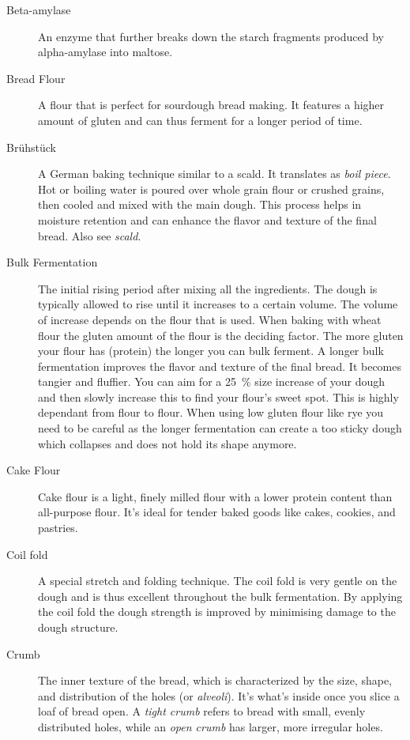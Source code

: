 \begin{description}
\item[Beta-amylase] An enzyme that further breaks down the starch fragments
produced by alpha-amylase into maltose.

\item[Bread Flour] A flour that is perfect for sourdough bread making. It features
a higher amount of gluten and can thus ferment for a longer period of time.

\item[Brühstück] A German baking technique similar to a scald. It translates as
\emph{boil piece}. Hot or boiling water is poured over whole grain flour or crushed grains,
then cooled and mixed with the main dough. This process helps in moisture retention
and can enhance the flavor and texture of the final bread. Also see \emph{scald}.

\item[Bulk Fermentation] The initial rising period after mixing all the ingredients.
The dough is typically allowed to rise until it increases to a certain volume. The
volume of increase depends on the flour that is used. When baking with wheat flour
the gluten amount of the flour is the deciding factor. The more gluten your flour has
(protein) the longer you can bulk ferment. A longer bulk fermentation improves the
flavor and texture of the final bread. It becomes tangier and fluffier. You can aim
for a \SI{25}{\percent} size increase of your dough and then slowly increase this to find your
flour’s sweet spot. This is highly dependant from flour to flour. When using low gluten
flour like rye you need to be careful as the longer fermentation can create a too
sticky dough which collapses and does not hold its shape anymore.

\item[Cake Flour] Cake flour is a light, finely milled flour with a lower protein
content than all-purpose flour. It's ideal for tender baked goods like cakes, cookies,
and pastries.

\item[Coil fold] A special stretch and folding technique. The coil fold is
very gentle on the dough and is thus excellent throughout the bulk fermentation.
By applying the coil fold the dough strength is improved by minimising damage
to the dough structure.

\item[Crumb] The inner texture of the bread, which is characterized by the size,
shape, and distribution of the holes (or \emph{alveoli}). It's what's inside once you slice
a loaf of bread open. A \emph{tight crumb} refers to bread with small, evenly distributed
holes, while an \emph{open crumb} has larger, more irregular holes.


\end{description}
